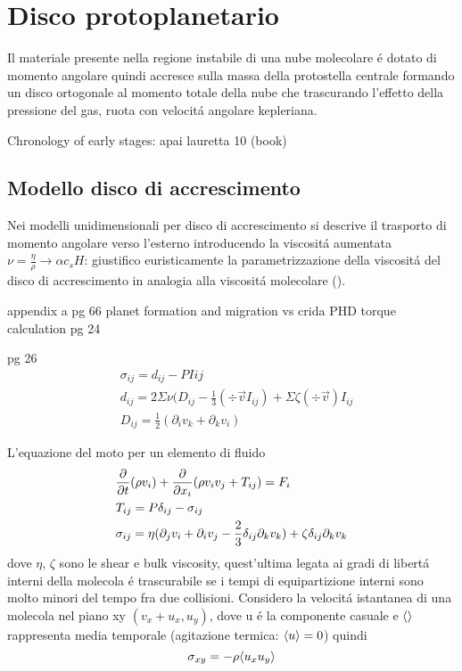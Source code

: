 {\let\clearpage\relax\let\cleardoublepage\relax
\chapter{Disco protoplanetario}
}

Il materiale presente nella regione instabile di una nube molecolare \'e dotato di momento angolare quindi accresce sulla massa della protostella centrale formando un disco ortogonale al momento totale della nube che trascurando l'effetto della pressione del gas, ruota con velocit\'a angolare kepleriana.

\begin{workout}
Chronology of  early stages: apai lauretta 10 (book)
\end{workout}

\section{Modello disco di accrescimento}

Nei modelli unidimensionali per disco di accrescimento si descrive il trasporto di momento angolare verso l'esterno introducendo la viscosit\'a aumentata $\nu=\frac{\eta}{\rho}\to\alpha c_s H$: giustifico euristicamente la parametrizzazione della viscosit\'a del disco di accrescimento in analogia alla viscosit\'a molecolare (\cite{bouvier2002theory}).

\begin{workout}
appendix a pg 66 planet formation and migration vs crida PHD torque calculation pg 24
\end{workout}
\begin{workout}
pg 26
\begin{align}
&\sigma_{ij}=d_{ij}-PI{ij}\\
&d_{ij}=2\Sigma\nu(D_{ij}-\frac{1}{3}(\div{\vec{v}}I_{ij})+\Sigma\zeta(\div{\vec{v}})I_{ij}\\
&D_{ij}=\frac{1}{2}(\partial_iv_k+\partial_kv_i)
\end{align}
\end{workout}

L'equazione del moto per un elemento di fluido
\begin{align}
&\frac{\partial}{\partial t}(\rho v_i)+\frac{\partial}{\partial x_i}(\rho v_iv_j+T_{ij})=F_i\label{eq:fluidmotion}\\
&T_{ij}=P\delta_{ij}-\sigma_{ij}\\
&\sigma_{ij}=\eta(\partial_jv_i+\partial_iv_j-\frac{2}{3}\delta_{ij}\partial_kv_k)+\zeta\delta_{ij}\partial_kv_k
\end{align}
dove $\eta$, $\zeta$ sono le shear e bulk viscosity, quest'ultima legata ai gradi di libert\'a interni della molecola \'e trascurabile se i tempi di equipartizione interni sono molto minori del tempo fra due collisioni.
Considero la velocit\'a istantanea di una molecola nel piano xy $(v_x+u_x,u_y)$, dove u \'e la componente casuale e $\langle  \rangle$ rappresenta media temporale (agitazione termica: $\langle u \rangle=0$) quindi
\begin{equation}
\sigma_{xy}=-\rho\langle u_xu_y \rangle
\end{equation}

